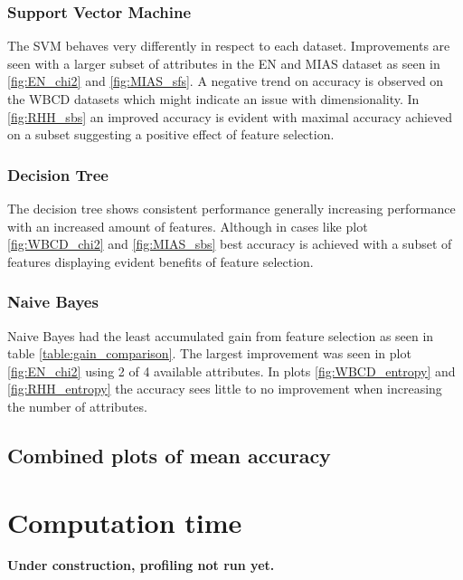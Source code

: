 \subsubsection{Support Vector Machine}

The SVM behaves very differently in respect to each dataset. Improvements are seen with a larger subset of attributes in the EN and MIAS dataset as seen in \ref{fig:EN_chi2} and \ref{fig:MIAS_sfs}. A negative trend on accuracy is observed on the WBCD datasets which might indicate an issue with dimensionality. In \ref{fig:RHH_sbs} an improved accuracy is evident with maximal accuracy achieved on a subset suggesting a positive effect of feature selection.

\subsubsection{Decision Tree}

The decision tree shows consistent performance generally increasing performance with an increased amount of features. Although in cases like plot \ref{fig:WBCD_chi2} and \ref{fig:MIAS_sbs} best accuracy is achieved with a subset of features displaying evident benefits of feature selection.

\subsubsection{Naive Bayes}

Naive Bayes had the least accumulated gain from feature selection as seen in table \ref{table:gain_comparison}. The largest improvement was seen in plot \ref{fig:EN_chi2} using 2 of 4 available attributes. In plots \ref{fig:WBCD_entropy} and \ref{fig:RHH_entropy} the accuracy sees little to no improvement when increasing the number of attributes.

\subsection{Combined plots of mean accuracy}






\section{Computation time}

\textbf{Under construction, profiling not run yet.}

